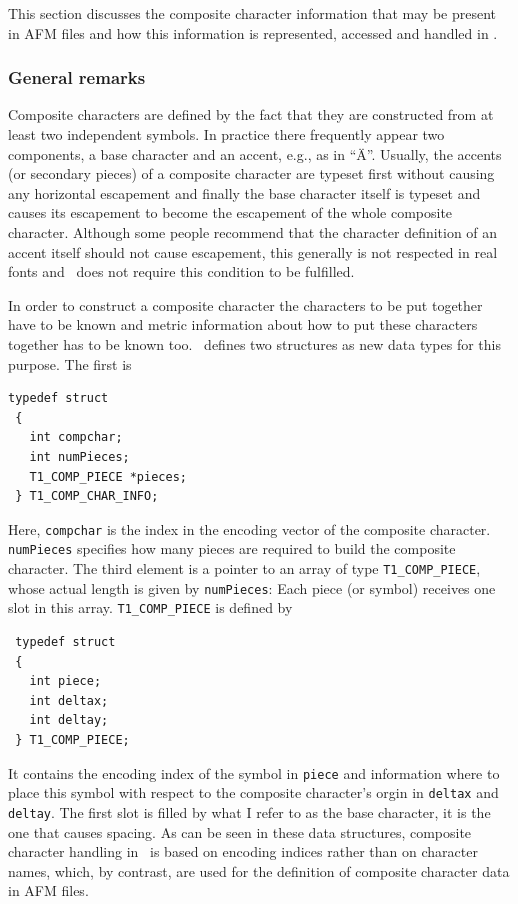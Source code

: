 This section discusses the composite character information that may be present
in AFM files and how this information is represented, accessed and handled in
\tonelib.  

\subsubsection{General remarks}
\label{subsubsec:General Remarks}%

Composite characters are defined by the fact that they are constructed from at
least two independent symbols. In practice there frequently appear two
components, a base character and an accent, e.g., as in ``\"A''. Usually, the
accents (or secondary pieces) of a composite character are typeset first
without causing any horizontal escapement and finally the base character
itself is typeset and causes its escapement to become the escapement of the
whole composite character. Although some people recommend that the character
definition of an accent itself should not cause escapement, this generally is
not respected in real fonts and \tonelib\ does not require this condition to
be fulfilled.

In order to construct a composite character the characters to be put together
have to be known and metric information about how to put these characters
together has to be known too. \tonelib\ defines two structures as new data types
for this purpose. The first is 
\begin{verbatim}
typedef struct 
 {
   int compchar;         
   int numPieces;        
   T1_COMP_PIECE *pieces;
 } T1_COMP_CHAR_INFO;
\end{verbatim}
Here, \verb+compchar+ is the index in the encoding vector of the composite
character. \verb+numPieces+ specifies how many pieces are
required to build the composite character. The third element is a pointer to
an array of type \verb+T1_COMP_PIECE+, whose actual length is given by
\verb+numPieces+: Each piece (or symbol) receives one slot in this
array. \verb+T1_COMP_PIECE+ is defined by
\begin{verbatim}
 typedef struct
 {
   int piece;     
   int deltax;    
   int deltay;    
 } T1_COMP_PIECE;
\end{verbatim}
It contains the encoding index of the symbol in \verb+piece+ and information
where to place this symbol with respect to the composite character's orgin in
\verb+deltax+ and \verb+deltay+. The first slot is filled by what I refer to
as the base character, it is the one that causes spacing. As can be seen in
these data structures, composite character handling in \tonelib\ is based on
encoding indices rather than on character names, which, by contrast, are used
for the definition of composite character data in AFM files.

